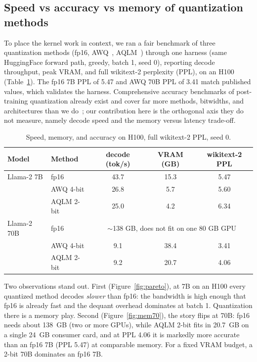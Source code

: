 \documentclass[11pt]{article}
\begin{document}
\subsection{Speed vs accuracy vs memory of quantization methods}
To place the kernel work in context, we ran a fair benchmark of three quantization
methods (fp16, AWQ~\cite{awq}, AQLM~\cite{aqlm}) through one harness (same
HuggingFace forward path, greedy, batch 1, seed 0), reporting decode throughput,
peak VRAM, and full wikitext-2 perplexity (PPL), on an H100 (Table~\ref{tab:quant}).
The fp16 7B PPL of 5.47 and AWQ 70B PPL of 3.41 match published values, which
validates the harness. Comprehensive accuracy benchmarks of post-training
quantization already exist and cover far more methods, bitwidths, and architectures
than we do~\cite{zhao2025}; our contribution here is the orthogonal axis they do not
measure, namely decode speed and the memory versus latency trade-off.

\begin{table}[h]
\centering
\begin{tabular}{llccc}
\toprule
Model & Method & decode (tok/s) & VRAM (GB) & wikitext-2 PPL \\
\midrule
Llama-2 7B  & fp16       & 43.7 & 15.3 & 5.47 \\
            & AWQ 4-bit  & 26.8 & 5.7  & 5.60 \\
            & AQLM 2-bit & 25.0 & 4.2  & 6.34 \\
\midrule
Llama-2 70B & fp16       & \multicolumn{3}{c}{$\sim$138 GB, does not fit on one 80 GB GPU} \\
            & AWQ 4-bit  & 9.1  & 38.4 & 3.41 \\
            & AQLM 2-bit & 9.2  & 20.7 & 4.06 \\
\bottomrule
\end{tabular}
\caption{Speed, memory, and accuracy on H100, full wikitext-2 PPL, seed 0.}
\label{tab:quant}
\end{table}

Two observations stand out. First (Figure~\ref{fig:pareto}), at 7B on an H100 every
quantized method decodes \emph{slower} than fp16: the bandwidth is high enough that
fp16 is already fast and the dequant overhead dominates at batch 1. Quantization
there is a memory play. Second (Figure~\ref{fig:mem70}), the story flips at 70B:
fp16 needs about 138~GB (two or more GPUs), while AQLM 2-bit fits in 20.7~GB on a
single 24~GB consumer card, and at PPL 4.06 it is markedly more accurate than an
fp16 7B (PPL 5.47) at comparable memory. For a fixed VRAM budget, a 2-bit 70B
dominates an fp16 7B.
\end{document}
